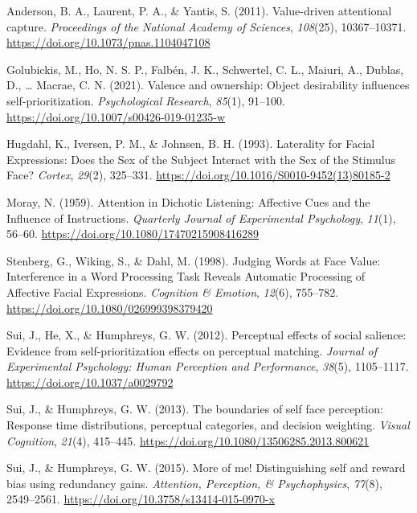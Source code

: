 \documentclass[
  man]{apa6}
\newlength{\cslhangindent}
\newenvironment{CSLReferences}[2] %
 {\begin{list}{}{%
  \setlength{\itemindent}{0pt}
  \setlength{\leftmargin}{0pt}
  \setlength{\parsep}{0pt}
  \ifodd #1
   \setlength{\leftmargin}{\cslhangindent}
   \setlength{\itemindent}{-1\cslhangindent}
  \fi
  \setlength{\itemsep}{#2\baselineskip}}}
 {\end{list}}
\begin{document}
\label{refs}
\begin{CSLReferences}{1}{0}
Anderson, B. A., Laurent, P. A., \& Yantis, S. (2011). Value-driven attentional capture. \emph{Proceedings of the National Academy of Sciences}, \emph{108}(25), 10367--10371. \url{https://doi.org/10.1073/pnas.1104047108}

Golubickis, M., Ho, N. S. P., Falbén, J. K., Schwertel, C. L., Maiuri, A., Dublas, D., \ldots{} Macrae, C. N. (2021). Valence and ownership: Object desirability influences self-prioritization. \emph{Psychological Research}, \emph{85}(1), 91--100. \url{https://doi.org/10.1007/s00426-019-01235-w}

Hugdahl, K., Iversen, P. M., \& Johnsen, B. H. (1993). Laterality for {Facial Expressions}: {Does} the {Sex} of the {Subject Interact} with the {Sex} of the {Stimulus Face}? \emph{Cortex}, \emph{29}(2), 325--331. \url{https://doi.org/10.1016/S0010-9452(13)80185-2}

Moray, N. (1959). Attention in {Dichotic Listening}: {Affective Cues} and the {Influence} of {Instructions}. \emph{Quarterly Journal of Experimental Psychology}, \emph{11}(1), 56--60. \url{https://doi.org/10.1080/17470215908416289}

Stenberg, G., Wiking, S., \& Dahl, M. (1998). Judging {Words} at {Face Value}: {Interference} in a {Word Processing Task Reveals Automatic Processing} of {Affective Facial Expressions}. \emph{Cognition \& Emotion}, \emph{12}(6), 755--782. \url{https://doi.org/10.1080/026999398379420}

Sui, J., He, X., \& Humphreys, G. W. (2012). Perceptual effects of social salience: Evidence from self-prioritization effects on perceptual matching. \emph{Journal of Experimental Psychology: Human Perception and Performance}, \emph{38}(5), 1105--1117. \url{https://doi.org/10.1037/a0029792}

Sui, J., \& Humphreys, G. W. (2013). The boundaries of self face perception: {Response} time distributions, perceptual categories, and decision weighting. \emph{Visual Cognition}, \emph{21}(4), 415--445. \url{https://doi.org/10.1080/13506285.2013.800621}

Sui, J., \& Humphreys, G. W. (2015). More of me! {Distinguishing} self and reward bias using redundancy gains. \emph{Attention, Perception, \& Psychophysics}, \emph{77}(8), 2549--2561. \url{https://doi.org/10.3758/s13414-015-0970-x}


\end{CSLReferences}
\end{document}

